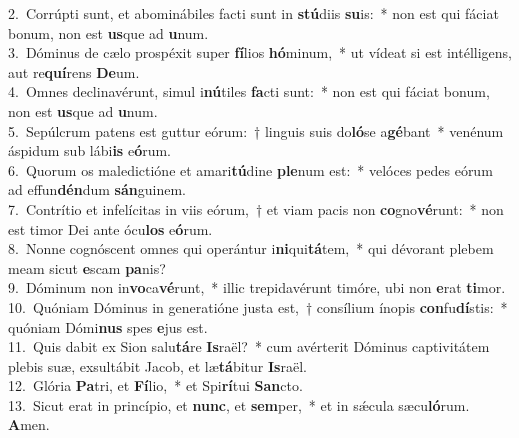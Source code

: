 {2.~}Corrúpti sunt, et abominábiles facti sunt in \textbf{stú}diis \textbf{su}is:~* non est qui fáciat bonum, non est \textbf{us}que ad \textbf{u}num.\\
{3.~}Dóminus de cælo prospéxit super \textbf{fí}lios \textbf{hó}minum,~* ut vídeat si est intélligens, aut re\textbf{quí}rens \textbf{De}um.\\
{4.~}Omnes declinavérunt, simul i\textbf{nú}tiles \textbf{fa}cti sunt:~* non est qui fáciat bonum, non est \textbf{us}que ad \textbf{u}num.\\
{5.~}Sepúlcrum patens est guttur eórum:~† linguis suis do\textbf{ló}se a\textbf{gé}bant~* venénum áspidum sub lábi\textbf{is} e\textbf{ó}rum.\\
{6.~}Quorum os maledictióne et amari\textbf{tú}dine \textbf{ple}num est:~* velóces pedes eórum ad effun\textbf{dén}dum \textbf{sán}guinem.\\
{7.~}Contrítio et infelícitas in viis eórum,~† et viam pacis non \textbf{co}gno\textbf{vé}runt:~* non est timor Dei ante ócu\textbf{los} e\textbf{ó}rum.\\
{8.~}Nonne cognóscent omnes qui operántur i\textbf{ni}qui\textbf{tá}tem,~* qui dévorant plebem meam sicut \textbf{e}scam \textbf{pa}nis?\\
{9.~}Dóminum non in\textbf{vo}ca\textbf{vé}runt,~* illic trepidavérunt timóre, ubi non \textbf{e}rat \textbf{ti}mor.\\
{10.~}Quóniam Dóminus in generatióne justa est,~† consílium ínopis \textbf{con}fu\textbf{dí}stis:~* quóniam Dómi\textbf{nus} spes \textbf{e}jus est.\\
{11.~}Quis dabit ex Sion salu\textbf{tá}re \textbf{Is}raël?~* cum avérterit Dóminus captivitátem plebis suæ, exsultábit Jacob, et læ\textbf{tá}bitur \textbf{Is}raël.\\
{12.~}Glória \textbf{Pa}tri, et \textbf{Fí}lio,~* et Spi\textbf{rí}tui \textbf{San}cto.\\
{13.~}Sicut erat in princípio, et \textbf{nunc}, et \textbf{sem}per,~* et in sǽcula sæcu\textbf{ló}rum. \textbf{A}men.\\
